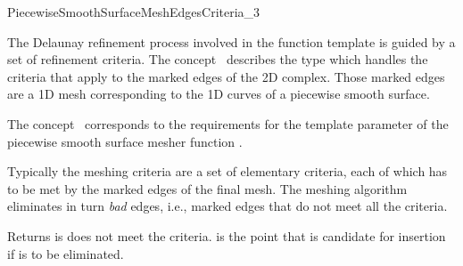 
\begin{ccRefConcept}{PiecewiseSmoothSurfaceMeshEdgesCriteria_3}

\ccDefinition
  
The Delaunay refinement process involved in the 
function template  
is guided by a set of refinement criteria.
The concept \ccRefName\ describes the type  which
handles the criteria that apply to the marked edges of the 2D
complex. Those marked edges are a 1D mesh corresponding to the 1D curves of
a piecewise smooth surface.

The concept \ccRefName\ corresponds to the requirements for the template
parameter  of the piecewise smooth surface mesher function
.

Typically the meshing criteria are a set
of elementary criteria, each of which
has to be met by  the marked edges of the final mesh.
The meshing algorithm eliminates in turn  {\em bad} edges, i.e.,
marked edges that do not meet all the criteria.

\ccTypes



\ccOperations
{}

{Returns  is  does not meet the criteria.  is the
  point that is candidate for insertion if  is to be eliminated.}

\ccHasModels


\ccSeeAlso
{}


\end{ccRefConcept}


